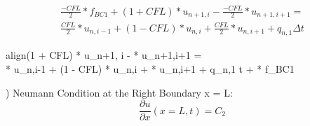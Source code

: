 \documentclass[10pt, letter, showtrims]{extarticle}
\newcommand{\boxedeq}[2]{\begin{empheq}[box={\fboxsep=6pt\fbox}]{align}\label{#1}#2\end{empheq}}
\begin{document}
		\begin{equation}
			\begin{split}
			\frac{-CFL}{2} * f_{BC1} + (1 + CFL) * u_{n+1, i} - \frac{-CFL}{2} * u_{n+1,i+1} = \\ 
			\frac{CFL}{2} * u_{n,i-1} + (1 - CFL) * u_{n,i} + \frac{CFL}{2} * u_{n,i+1} + q_{n,1} \Delta t
			\end{split}
		\end{equation}
		
		\boxedeq{}{(1 + CFL) * u_{n+1, i} -  * u_{n+1,i+1} = \\ \frac{CFL}{2} * u_{n,i-1} + (1 - CFL) * u_{n,i} + \frac{CFL}{2} * u_{n,i+1} + q_{n,1} \Delta t + \frac{CFL}{2} * f_{BC1}}    		
    		
		) Neumann Condition at the Right Boundary x = L: \\
		
		\begin{equation}
			\frac{\partial u}{\partial x}(x=L, t) = C_{2}
    		\end{equation}
%    		
%    		
%    		
%    		
%    		
%    		
%
%		
%    		
    		
\end{document}
